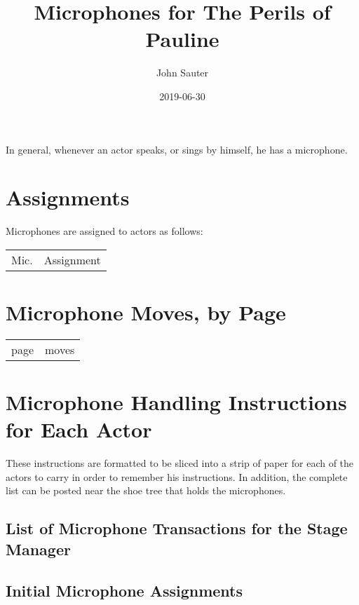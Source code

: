 \documentclass[letterpaper]{article}
\title{Microphones for The Perils of Pauline}
\author{John Sauter}
\date{2019-06-30}
\begin{document}
\maketitle
\tableofcontents
\newpage

In general, whenever an actor speaks, or sings by himself, he has a microphone.

\section {Assignments}
Microphones are assigned to actors as follows:

\begin{center}
\begin{longtable}{|l|m{7in}|}
\hline Mic. & Assignment \endhead \hline

\end{longtable}
\end{center}

\section {Microphone Moves, by Page}

\begin{center}
\begin{longtable}{|l|m{7in}|}
\hline page & moves \endhead \hline

\end{longtable}
\end{center}

\section {Microphone Handling Instructions for Each Actor}

These instructions are formatted to be sliced into a strip of paper
for each of the actors to carry in order to remember his instructions.
In addition, the complete list can be posted near the shoe tree that
holds the microphones.

\vskip 0.25in

{\setlength{\parindent}{0in}

}

\subsection {List of Microphone Transactions for the Stage Manager}

\subsection {Initial Microphone Assignments}
\end{document}

